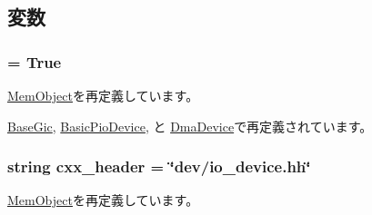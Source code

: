 \subsection{変数}
\hypertarget{classDevice_1_1PioDevice_a17fa61ac3806b481cafee5593b55e5d0}{
\subsubsection[{abstract}]{ = True}}
\label{classDevice_1_1PioDevice_a17fa61ac3806b481cafee5593b55e5d0}


\hyperlink{classMemObject_1_1MemObject_a17fa61ac3806b481cafee5593b55e5d0}{MemObject}を再定義しています。

\hyperlink{classGic_1_1BaseGic_a17fa61ac3806b481cafee5593b55e5d0}{BaseGic}, \hyperlink{classDevice_1_1BasicPioDevice_a17fa61ac3806b481cafee5593b55e5d0}{BasicPioDevice}, と \hyperlink{classDevice_1_1DmaDevice_a17fa61ac3806b481cafee5593b55e5d0}{DmaDevice}で再定義されています。\hypertarget{classDevice_1_1PioDevice_a17da7064bc5c518791f0c891eff05fda}{
\subsubsection[{cxx\_\-header}]{\setlength{\rightskip}{0pt plus 5cm}string {\bf cxx\_\-header} = \char`\"{}dev/io\_\-device.hh\char`\"{}}}
\label{classDevice_1_1PioDevice_a17da7064bc5c518791f0c891eff05fda}


\hyperlink{classMemObject_1_1MemObject_a17da7064bc5c518791f0c891eff05fda}{MemObject}を再定義しています。

